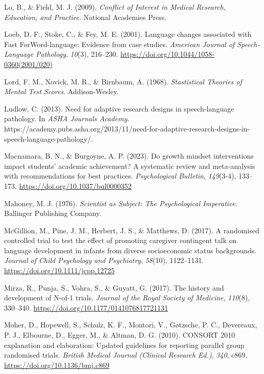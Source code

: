 \documentclass{krantz}
\newlength{\cslhangindent}
\newlength{\cslentryspacingunit} %
\newenvironment{CSLReferences}[2] %
{%
\setlength{\parindent}{0pt}
\ifodd #1
\let\oldpar\par
\def\par{\hangindent=\cslhangindent\oldpar}
\fi
\setlength{\parskip}{#2\cslentryspacingunit}
}%
{}
\begin{document}
\begin{CSLReferences}{1}{0}
\leavevmode{}%
Lo, B., \& Field, M. J. (2009). \emph{Conflict of {Interest} in {Medical Research}, {Education}, and {Practice}}. {National Academies Press}.

\leavevmode{}%
Loeb, D. F., Stoke, C., \& Fey, M. E. (2001). Language changes associated with {Fast ForWord-language}: {Evidence} from case studies. \emph{American Journal of Speech-Language Pathology}, \emph{10}(3), 216--230. \url{https://doi.org/10.1044/1058-0360(2001/020)}

\leavevmode{}%
Lord, F. M., Novick, M. R., \& Birnbaum, A. (1968). \emph{Stastistical {Theories} of {Mental Test Scores}}. {Addison-Wesley}.

\leavevmode{}%
Ludlow, C. (2013). Need for adaptive research designs in speech-language pathology. In \emph{ASHA Journals Academy}. https://academy.pubs.asha.org/2013/11/need-for-adaptive-research-designs-in-speech-language-pathology/.

\leavevmode{}%
Macnamara, B. N., \& Burgoyne, A. P. (2023). Do growth mindset interventions impact students' academic achievement? {A} systematic review and meta-analysis with recommendations for best practices. \emph{Psychological Bulletin}, \emph{149}(3-4), 133--173. \url{https://doi.org/10.1037/bul0000352}

\leavevmode{}%
Mahoney, M. J. (1976). \emph{Scientist as {Subject}: {The Psychological Imperative}}. {Ballinger Publishing Company}.

\leavevmode{}%
McGillion, M., Pine, J. M., Herbert, J. S., \& Matthews, D. (2017). A randomised controlled trial to test the effect of promoting caregiver contingent talk on language development in infants from diverse socioeconomic status backgrounds. \emph{Journal of Child Psychology and Psychiatry}, \emph{58}(10), 1122--1131. \url{https://doi.org/10.1111/jcpp.12725}

\leavevmode{}%
Mirza, R., Punja, S., Vohra, S., \& Guyatt, G. (2017). The history and development of {N-of-1} trials. \emph{Journal of the Royal Society of Medicine}, \emph{110}(8), 330--340. \url{https://doi.org/10.1177/0141076817721131}

\leavevmode{}%
Moher, D., Hopewell, S., Schulz, K. F., Montori, V., Gøtzsche, P. C., Devereaux, P. J., Elbourne, D., Egger, M., \& Altman, D. G. (2010). {CONSORT} 2010 explanation and elaboration: Updated guidelines for reporting parallel group randomised trials. \emph{British Medical Journal (Clinical Research Ed.)}, \emph{340}, c869. \url{https://doi.org/10.1136/bmj.c869}


\end{CSLReferences}
\end{document}
